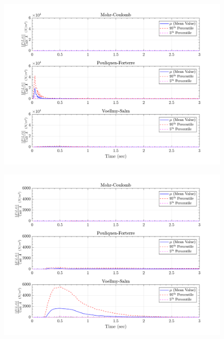 \documentclass{article}
\begin{document}
\begin{figure}[H]
	\begin{minipage}[b]{0.5\linewidth}
    	\centering
    	\includegraphics[width=1\textwidth]{InclinedPlane/LocalRecords/Records/Fr_L1.png}
    	\label{fig:Ramp-L1-Fr}
	\end{minipage}
	\begin{minipage}[b]{0.5\linewidth}
		\centering
		\includegraphics[width=1\textwidth]{InclinedPlane/LocalRecords/Records/Fr_L8.png}
    	\label{fig:Ramp-L2-Fr}
    \end{minipage}
    

\end{figure}
\end{document}
